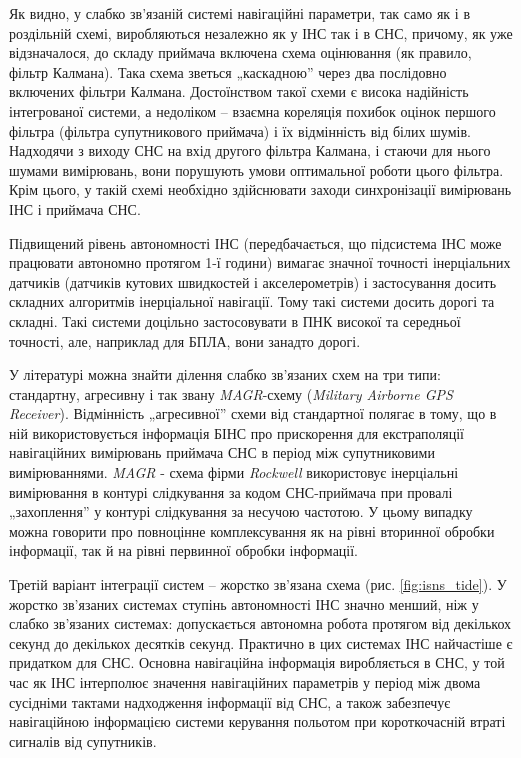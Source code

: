 Як видно, у слабко зв'язаній системі навігаційні параметри, так само як і в роздільній 
схемі, виробляються незалежно як у ІНС так і в СНС, причому, як уже відзначалося, 
до складу приймача включена схема оцінювання (як правило, фільтр Калмана). Така схема 
зветься „каскадною'' через два послідовно включених фільтри Калмана. Достоїнством 
такої схеми є висока надійність інтегрованої системи, а недоліком -- взаємна кореляція 
похибок оцінок першого фільтра (фільтра супутникового приймача) і їх відмінність 
від білих шумів. Надходячи з виходу СНС на вхід другого фільтра Калмана, і стаючи 
для нього шумами вимірювань, вони порушують умови оптимальної роботи цього фільтра. 
Крім цього, у такій схемі необхідно здійснювати заходи синхронізації вимірювань ІНС 
і приймача СНС.

Підвищений рівень автономності ІНС (передбачається, що підсистема ІНС може працювати 
автономно протягом 1-ї години) вимагає значної точності інерціальних датчиків (датчиків 
кутових швидкостей і акселерометрів) і застосування досить складних алгоритмів інерціальної 
навігації. Тому такі системи досить дорогі та складні. Такі системи доцільно застосовувати 
в ПНК високої та середньої точності, але, наприклад для БПЛА, вони занадто дорогі.

У літературі можна знайти ділення слабко зв'язаних схем на три типи: стандартну, агресивну 
і так звану \textit{MAGR}-схему (\textit{Military Airborne GPS Receiver}). Відмінність 
„агресивної'' схеми від стандартної полягає в тому, що в ній використовується інформація 
БІНС про прискорення для екстраполяції навігаційних вимірювань приймача СНС в період 
між супутниковими вимірюваннями. \textit{MAGR} - схема фірми \textit{Rockwell} використовує 
інерціальні вимірювання в контурі слідкування за кодом СНС-приймача при провалі „захоплення'' 
у контурі слідкування за несучою частотою. У цьому випадку можна говорити про повноцінне 
комплексування як на рівні вторинної обробки інформації, так й на рівні первинної 
обробки інформації.

Третій варіант інтеграції систем -- жорстко зв'язана схема (рис. \ref{fig:isns_tide}).
У жорстко зв'язаних системах ступінь автономності ІНС значно менший, ніж у слабко зв'язаних 
системах: допускається автономна робота протягом від декількох секунд до декількох 
десятків секунд. Практично в цих системах ІНС найчастіше є придатком для СНС. Основна 
навігаційна інформація виробляється в СНС, у той час як ІНС інтерполює значення навігаційних 
параметрів у період між двома сусідніми тактами надходження інформації від СНС, а 
також забезпечує навігаційною інформацією системи керування польотом при короткочасній 
втраті сигналів від супутників. 

